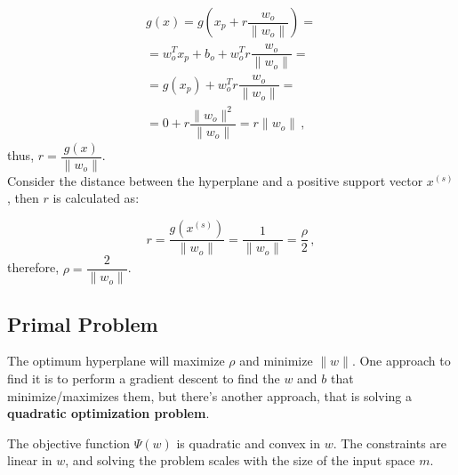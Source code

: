\begin{align*}
    g(x) = g(x_p + r\dfrac{w_o}{\|w_o\|}) = \\
    = w_o^Tx_p + b_o + w_o^T r \dfrac{w_o}{\|w_o\|} = \\
    = g(x_p) + w_o^T r \dfrac{w_o}{\|w_o\|} = \\
    = 0 + r \dfrac{\|w_o\|^2}{\|w_o\|} = r \|w_o\| \, ,
\end{align*}
thus, $r = \dfrac{g(x)}{\|w_o\|}$. \\
Consider the distance between the hyperplane and a positive support vector $x^{(s)}$, then $r$ is calculated as:

\begin{equation*}
    r = \dfrac{g(x^{(s)})}{\|w_o\|} = \dfrac{1}{\|w_o\|} = \dfrac{\rho}{2} \, ,
\end{equation*}
therefore, $\rho = \dfrac{2}{\|w_o\|}$.

\subsection{Primal Problem}

The optimum hyperplane will maximize $\rho$ and minimize $\|w\|$. One approach to find it is to perform a gradient descent to find the $w$ and $b$ that minimize/maximizes them, but there's another approach, that is solving a \textbf{quadratic optimization problem}.

The objective function $\Psi (w)$ is quadratic and convex in $w$. The constraints are linear in $w$, and solving the problem scales with the size of the input space $m$.

